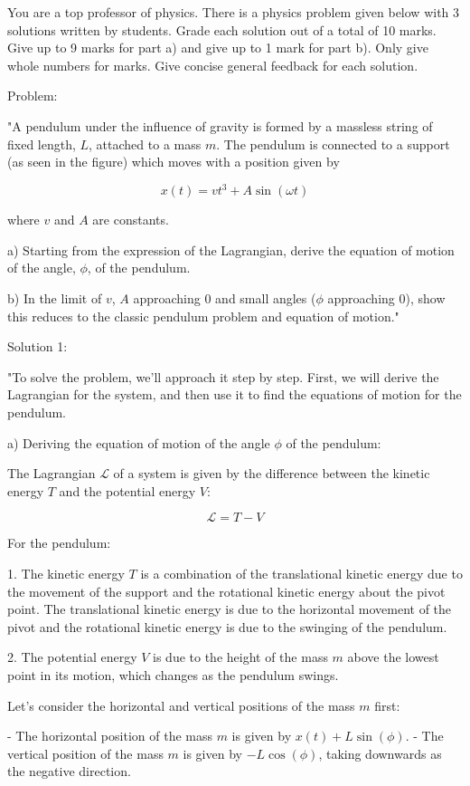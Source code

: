 You are a top professor of physics. There is a physics problem given below with 3 solutions written by students. Grade each solution out of a total of 10 marks. Give up to 9 marks for part a) and give up to 1 mark for part b). Only give whole numbers for marks. Give concise general feedback for each solution.

Problem:

"A pendulum under the influence of gravity is formed by a massless string of fixed length, \( L \), attached to a mass \( m \). The pendulum is connected to a support (as seen in the figure) which moves with a position given by 

\[ x(t) = v t^3 + A \sin(\omega t) \]
    
where \( v \) and \( A \) are constants.
    
a) Starting from the expression of the Lagrangian, derive the equation of motion of the angle, \( \phi \), of the pendulum. 
    
b) In the limit of \( v \), \(A\) approaching 0 and small angles (\( \phi \) approaching 0), show this reduces to the classic pendulum problem and equation of motion."

Solution 1:

"To solve the problem, we'll approach it step by step. First, we will derive the Lagrangian for the system, and then use it to find the equations of motion for the pendulum.

a) Deriving the equation of motion of the angle \( \phi \) of the pendulum:

The Lagrangian \( \mathcal{L} \) of a system is given by the difference between the kinetic energy \( T \) and the potential energy \( V \):

\[ \mathcal{L} = T - V \]

For the pendulum:

1. The kinetic energy \( T \) is a combination of the translational kinetic energy due to the movement of the support and the rotational kinetic energy about the pivot point. The translational kinetic energy is due to the horizontal movement of the pivot and the rotational kinetic energy is due to the swinging of the pendulum.

2. The potential energy \( V \) is due to the height of the mass \( m \) above the lowest point in its motion, which changes as the pendulum swings.

Let's consider the horizontal and vertical positions of the mass \( m \) first:

- The horizontal position of the mass \( m \) is given by \( x(t) + L \sin(\phi) \).
- The vertical position of the mass \( m \) is given by \( -L \cos(\phi) \), taking downwards as the negative direction.

